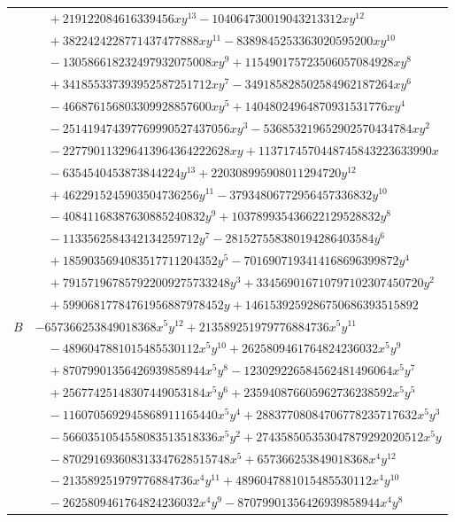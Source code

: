 \documentclass[11pt]{article}
\begin{document}
\begin{longtable}{@{}ll@{}}
 & $\quad +219122084616339456xy^{13}-104064730019043213312xy^{12}$\\
 & $\quad +3822424228771437477888xy^{11}-8389845253363020595200xy^{10}$\\
 & $\quad -130586618232497932075008xy^{9}+115490175723506057084928xy^{8}$\\
 & $\quad +341855337393952587251712xy^{7}-349185828502584962187264xy^{6}$\\
 & $\quad -466876156803309928857600xy^{5}+14048024964870931531776xy^{4}$\\
 & $\quad -251419474397769990527437056xy^{3}-536853219652902570434784xy^{2}$\\
 & $\quad -227790113296413964364222628xy+1137174570448745843223633990x$\\
 & $\quad -6354540453873844224y^{13}+220308995908011294720y^{12}$\\
 & $\quad +4622915245903504736256y^{11}-37934806772956457336832y^{10}$\\
 & $\quad -40841168387630885240832y^{9}+103789935436622129528832y^{8}$\\
 & $\quad -1133562584342134259712y^{7}-281527558380194286403584y^{6}$\\
 & $\quad +1859035694083517711204352y^{5}-7016907193414168696399872y^{4}$\\
 & $\quad +791571967857922009275733248y^{3}+334569016710797102307450720y^{2}$\\
 & $\quad +59906817784761956887978452y+1461539259286750686393515892$\\
$B$ & $-657366253849018368x^{5}y^{12}+213589251979776884736x^{5}y^{11}$\\
 & $\quad -4896047881015485530112x^{5}y^{10}+2625809461764824236032x^{5}y^{9}$\\
 & $\quad +87079901356426939858944x^{5}y^{8}-123029226584562481496064x^{5}y^{7}$\\
 & $\quad +25677425148307449053184x^{5}y^{6}+235940876605962736238592x^{5}y^{5}$\\
 & $\quad -1160705692945868911165440x^{5}y^{4}+28837708084706778235717632x^{5}y^{3}$\\
 & $\quad -5660351054558083513518336x^{5}y^{2}+274358505353047879292020512x^{5}y$\\
 & $\quad -870291693608313347628515748x^{5}+657366253849018368x^{4}y^{12}$\\
 & $\quad -213589251979776884736x^{4}y^{11}+4896047881015485530112x^{4}y^{10}$\\
 & $\quad -2625809461764824236032x^{4}y^{9}-87079901356426939858944x^{4}y^{8}$\\

\end{longtable}
\end{document}
